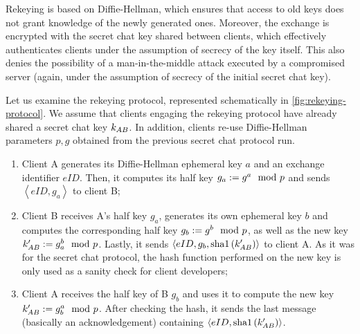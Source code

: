 Rekeying is based on Diffie-Hellman, which ensures that access to old keys does not grant knowledge of the newly generated ones. Moreover, the exchange is encrypted with the secret chat key shared between clients, which effectively authenticates clients under the assumption of secrecy of the key itself. This also denies the possibility of a man-in-the-middle attack executed by a compromised server (again, under the assumption of secrecy of the initial secret chat key).

Let us examine the rekeying protocol, represented schematically in \cref{fig:rekeying-protocol}. We assume that clients engaging the rekeying protocol have already shared a secret chat key $k_{AB}$. In addition, clients re-use Diffie-Hellman parameters $p, g$ obtained from the previous secret chat protocol run.

\begin{enumerate}
    \item{Client A generates its Diffie-Hellman ephemeral key $a$ and an exchange identifier $eID$. Then, it computes its half key $g_a:= g^a \mod{p}$ and sends $\left<eID, g_a\right>$ to client B;}
    \item{Client B receives A's half key $g_a$, generates its own ephemeral key $b$ and computes the corresponding half key $g_b:= g^b \mod{p}$, as well as the new key $k'_{AB}:= g_a^b \mod{p}$. Lastly, it sends $\left<eID, g_b, \mbox{sha1}\left(k'_{AB}\right)\right>$ to client A. As it was for the secret chat protocol, the hash function performed on the new key is only used as a sanity check for client developers;}
    \item{Client A receives the half key of B $g_b$ and uses it to compute the new key $k'_{AB}:= g_b^a \mod{p}$. After checking the hash, it sends the last message (basically an acknowledgement) containing $\left<eID, \mbox{sha1}\left(k'_{AB}\right)\right>$.}
\end{enumerate}